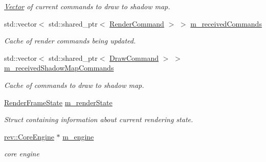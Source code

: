 \begin{Indent}
\begin{DoxyCompactItemize}
\begin{DoxyCompactList}\small\item\em \mbox{\hyperlink{classrev_1_1_vector}{Vector}} of current commands to draw to shadow map. \end{DoxyCompactList}\item 
\mbox{\label{classrev_1_1_main_renderer_aba69edb2ad0b1e517078d4718f0da0d3}} 
std\+::vector$<$ std\+::shared\+\_\+ptr$<$ \mbox{\hyperlink{classrev_1_1_render_command}{Render\+Command}} $>$ $>$ \mbox{\hyperlink{classrev_1_1_main_renderer_aba69edb2ad0b1e517078d4718f0da0d3}{m\+\_\+received\+Commands}}
\begin{DoxyCompactList}\small\item\em Cache of render commands being updated. \end{DoxyCompactList}\item 
\mbox{\label{classrev_1_1_main_renderer_ae83f24cd42ad84f6da59e8f9e60aa24c}} 
std\+::vector$<$ std\+::shared\+\_\+ptr$<$ \mbox{\hyperlink{classrev_1_1_draw_command}{Draw\+Command}} $>$ $>$ \mbox{\hyperlink{classrev_1_1_main_renderer_ae83f24cd42ad84f6da59e8f9e60aa24c}{m\+\_\+received\+Shadow\+Map\+Commands}}
\begin{DoxyCompactList}\small\item\em Cache of commands to draw to shadow map. \end{DoxyCompactList}\item 
\mbox{\label{classrev_1_1_main_renderer_ac6526c50be21c4952b08ba53a4831cf9}} 
\mbox{\hyperlink{structrev_1_1_render_frame_state}{Render\+Frame\+State}} \mbox{\hyperlink{classrev_1_1_main_renderer_ac6526c50be21c4952b08ba53a4831cf9}{m\+\_\+render\+State}}
\begin{DoxyCompactList}\small\item\em Struct containing information about current rendering state. \end{DoxyCompactList}\item 
\mbox{\label{classrev_1_1_main_renderer_a319b60735edb67eeeb139e95f6e755e4}} 
\mbox{\hyperlink{classrev_1_1_core_engine}{rev\+::\+Core\+Engine}} $\ast$ \mbox{\hyperlink{classrev_1_1_main_renderer_a319b60735edb67eeeb139e95f6e755e4}{m\+\_\+engine}}
\begin{DoxyCompactList}\small\item\em core engine \end{DoxyCompactList}\item 

\end{DoxyCompactItemize}
\end{Indent}
